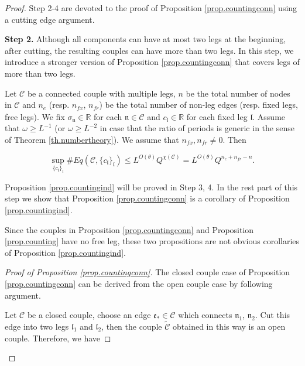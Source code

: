 \begin{proof}
Step 2-4 are devoted to the proof of Proposition \ref{prop.countingconn} using a cutting edge argument. 


\textbf{Step 2.} Although all components can have at most two legs at the beginning, after cutting, the resulting couples can have more than two legs. In this step, we introduce a stronger version of Proposition \ref{prop.countingconn} that covers legs of more than two legs.

\begin{lem}\label{prop.countingind}
Let $\mathcal{C}$ be a connected couple with multiple legs, $n$ be the total number of nodes in $\mathcal{C}$ and $n_e$ (resp. $n_{\textit{fx}}$, $n_{\textit{fr}}$) be the total number of non-leg edges (resp. fixed legs, free legs). We fix $\sigma_{\mathfrak{n}}\in\mathbb{R}$ for each $\mathfrak{n}\in \mathcal{C}$ and $c_{\mathfrak{l}}\in \mathbb{R}$ for each fixed leg $\mathfrak{l}$. Assume that $\omega\ge L^{-1}$ (or $\omega\ge L^{-2}$ in case that the ratio of periods is generic in the sense of Theorem \ref{th.numbertheory}). We assume that $n_{\textit{fx}},n_{\textit{fr}}\ne 0$. Then 

\begin{equation}\label{eq.countingbd3}
\sup_{\{c_{\mathfrak{l}}\}_{\mathfrak{l}}}\#Eq(\mathcal{C},\{c_{\mathfrak{l}}\}_{\mathfrak{l}})\leq L^{O(\theta)} Q^{\chi(\mathcal{C})} = L^{O(\theta)} Q^{n_e+n_{\textit{fr}}-n}.
\end{equation}

\end{lem}

Proposition \ref{prop.countingind} will be proved in Step 3, 4. In the rest part of this step we show that Proposition \ref{prop.countingconn} is a corollary of Proposition \ref{prop.countingind}.

Since the couples in Proposition \ref{prop.countingconn} and Proposition \ref{prop.counting} have no free leg, these two propositions are not obvious corollaries of Proposition \ref{prop.countingind}.

\begin{proof}[Proof of Proposition \ref{prop.countingconn}]
The closed couple case of Proposition \ref{prop.countingconn} can be derived from the open couple case by following argument.

Let $\mathcal{C}$ be a closed couple, choose an edge $\mathfrak{e}_{*}\in \mathcal{C}$ which connects $\mathfrak{n}_1$, $\mathfrak{n}_2$. Cut this edge into two legs $\mathfrak{l}_1$ and $\mathfrak{l}_2$, then the couple $\widetilde{\mathcal{C}}$ obtained in this way is an open couple. Therefore, we have


\end{proof}
\end{proof}
